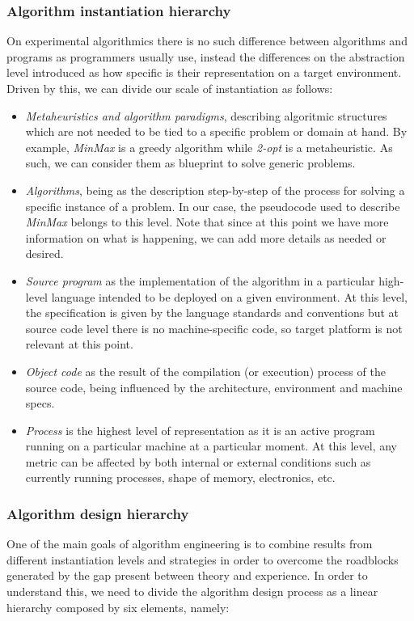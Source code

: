 \subsubsection{Algorithm instantiation hierarchy}
On experimental algorithmics there is no such difference between algorithms and programs as programmers usually use, instead the differences on the abstraction level introduced as how specific is their representation on a target environment. Driven by this, we can divide our scale of instantiation as follows:
\begin{itemize}
    \item \textit{Metaheuristics and algorithm paradigms}, describing algoritmic structures which are not needed to be tied to a specific problem or domain at hand. By example, \textit{MinMax} is a greedy algorithm while \textit{2-opt} is a metaheuristic. As such, we can consider them as blueprint to solve generic problems.
    \item \textit{Algorithms}, being as the description step-by-step of the process for solving a specific instance of a problem. In our case, the pseudocode used to describe \textit{MinMax} belongs to this level. Note that since at this point we have more information on what is happening, we can add more details as needed or desired.
    \item \textit{Source program} as the implementation of the algorithm in a particular high-level language intended to be deployed on a given environment. At this level, the specification is given by the language standards and conventions but at source code level there is no machine-specific code, so target platform is not relevant at this point.
    \item \textit{Object code} as the result of the compilation (or execution) process of the source code, being influenced by the architecture, environment and machine specs.
    \item \textit{Process} is the highest level of representation as it is an active program running on a particular machine at a particular moment. At this level, any metric can be affected by both internal or external conditions such as currently running processes, shape of memory, electronics, etc.
\end{itemize}

\subsubsection{Algorithm design hierarchy}
One of the main goals of algorithm engineering is to combine results from different instantiation levels and strategies in order to overcome the roadblocks generated by the gap present between theory and experience. In order to understand this, we need to divide the algorithm design process as a linear hierarchy composed by six elements, namely:

